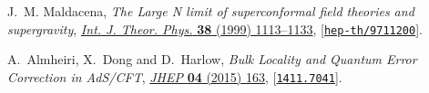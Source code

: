 \documentclass[10pt]{article}
\begin{document}
\begin{thebibliography}{100}
J.~M. Maldacena, \emph{{The Large N limit of superconformal field theories and
  supergravity}}, \href{http://dx.doi.org/10.1023/A:1026654312961}{\emph{Int.
  J. Theor. Phys.} {\bf 38} (1999) 1113--1133},
  [\href{http://arxiv.org/abs/hep-th/9711200}{{\tt hep-th/9711200}}].

A.~Almheiri, X.~Dong and D.~Harlow, \emph{{Bulk Locality and Quantum Error
  Correction in AdS/CFT}},
  \href{http://dx.doi.org/10.1007/JHEP04(2015)163}{\emph{JHEP} {\bf 04} (2015)
  163}, [\href{http://arxiv.org/abs/1411.7041}{{\tt 1411.7041}}].

\end{thebibliography}
 
\end{document}
